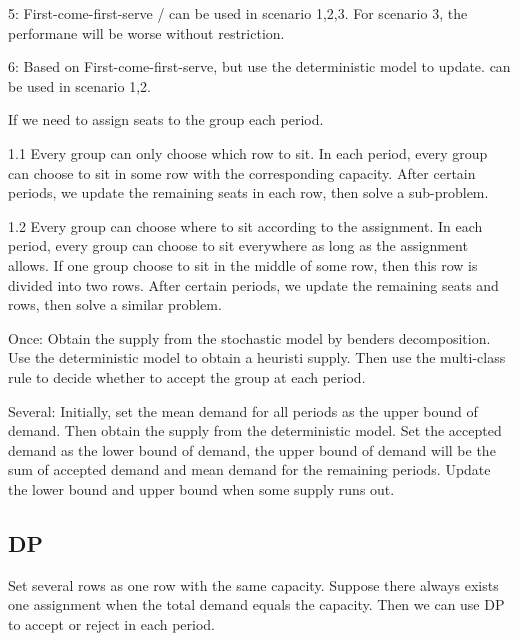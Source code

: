 5: First-come-first-serve / can be used in scenario 1,2,3. For scenario 3, the performane will be worse without restriction.

6: Based on First-come-first-serve, but use the deterministic model to update. can be used in scenario 1,2. 


If we need to assign seats to the group each period.

1.1 Every group can only choose which row to sit.
In each period, every group can choose to sit in some row with the corresponding capacity. 
After certain periods, we update the remaining seats in each row, then solve a sub-problem. 

1.2 Every group can choose where to sit according to the assignment.
In each period, every group can choose to sit everywhere as long as the assignment allows. If one group choose to sit in the middle of some row, then this row is divided into two rows. 
After certain periods, we update the remaining seats and rows, then solve a similar problem.




Once: Obtain the supply from the stochastic model by benders decomposition. Use the deterministic model to obtain a heuristi supply. Then use the multi-class rule to decide whether to accept the group at each period.

Several: Initially, set the mean demand for all periods as the upper bound of demand. Then obtain the supply from the deterministic model. Set the accepted demand as the lower bound of demand, the upper bound of demand will be the sum of accepted demand and mean demand for the remaining periods. Update the lower bound and upper bound when some supply runs out.




\subsection{DP}
Set several rows as one row with the same capacity.
Suppose there always exists one assignment when the total demand equals the capacity.
Then we can use DP to accept or reject in each period.

